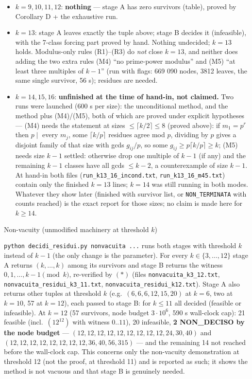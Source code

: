 \documentclass[11pt,a4paper]{article}
\providecommand{\tightlist}{\setlength{\itemsep}{0pt}\setlength{\parskip}{0pt}}
\begin{document}
\begin{itemize}
\tightlist
\item
  \(k=9,10,11,12\): \textbf{nothing} --- stage A has zero survivors
  (table), proved by Corollary D + the exhaustive run.
\item
  \(k=13\): stage A leaves exactly the tuple above; stage B decides it
  (infeasible), with the 7-class forcing part proved by hand. Nothing
  undecided; \(k=13\) holds. Modulus-only rules (R1)--(R3) do \emph{not}
  close \(k=13\), and neither does adding the two extra rules (M4) ``no
  prime-power modulus'' and (M5) ``at least three multiples of \(k-1\)''
  (run with flags: 669 090 nodes, 3812 leaves, the same single survivor,
  56 s); residues are needed.
\item
  \(k=14,15,16\): \textbf{unfinished at the time of hand-in, not
  claimed.} Two runs were launched (600 s per size): the unconditional
  method, and the method plus (M4)/(M5), both of which are proved under
  explicit hypotheses --- (M4) needs the statement at sizes
  \(\le\lceil k/2\rceil\le8\) (proved above): if \(m_1=p^r\) then
  \(p\mid\) every \(m_j\), some \(\lceil k/p\rceil\) residues agree mod
  \(p\), dividing by \(p\) gives a disjoint family of that size with
  gcds \(g_{ij}/p\), so some \(g_{ij}\ge p\lceil k/p\rceil\ge k\); (M5)
  needs size \(k-1\) settled: otherwise drop one multiple of \(k-1\) (if
  any) and the remaining \(k-1\) classes have all gcds \(\le k-2\), a
  counterexample of size \(k-1\). At hand-in both files
  (\texttt{run\_k13\_16\_incond.txt}, \texttt{run\_k13\_16\_m45.txt})
  contain only the finished \(k=13\) lines; \(k=14\) was still running
  in both modes. Whatever they show later (finished with survivor list,
  or \texttt{NON\_TERMINATA} with counts reached) is the exact report
  for those sizes; no claim is made here for \(k\ge14\).
\end{itemize}

Non-vacuity (unmodified machinery at threshold \(k\))

\texttt{python\ decidi\_residui.py\ nonvacuita\ ...} runs both stages
with threshold \(k\) instead of \(k-1\) (the only change is the
parameter). For every \(k\in\{3,\dots,12\}\) stage A returns
\((k,\dots,k)\) among its survivors and stage B returns the witness
\(0,1,\dots,k-1\pmod k\), re-verified by \((*)\) (files
\texttt{nonvacuita\_k3\_12.txt},
\texttt{nonvacuita\_residui\_k3\_11.txt},
\texttt{nonvacuita\_residui\_k12.txt}). Stage A also returns other
tuples at threshold \(k\) (e.g.~\((6,6,6,12,15,20)\) at \(k=6\), two at
\(k=10\), 57 at \(k=12\)), each passed to stage B: for \(k\le11\) all
decided (feasible or infeasible). At \(k=12\) (57 survivors, node budget
\(3\cdot10^6\), 590 s wall-clock cap): 21 feasible (incl.~\((12^{12})\)
with witness \(0..11\)), 20 infeasible, \textbf{2 NON\_DECISO by the
node budget} --- \((12,12,12,12,12,12,12,12,12,24,30,40)\) and
\((12,12,12,12,12,12,12,12,36,40,56,315)\) --- and the remaining 14 not
reached before the wall-clock cap. This concerns only the non-vacuity
demonstration at threshold 12 (not the proof, at threshold 11) and is
reported as such; it shows the method is not vacuous and that stage B is
genuinely needed.
\end{document}
